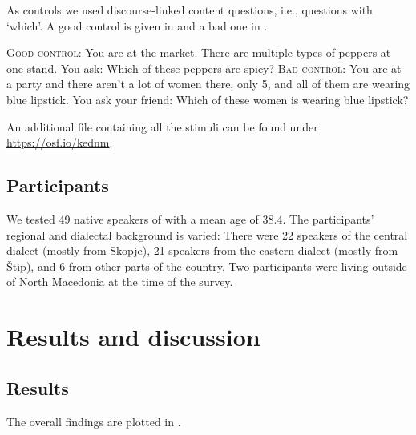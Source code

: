 \documentclass[output=paper,
colorlinks,
citecolor=brown,
newtxmath
]{langscibook}
\begin{document}
\noindent
As controls we used discourse-linked content questions, i.e., questions with `which'. A good control is given in  and a bad one in .


\eanoraggedright
\eanoraggedright \textsc{Good control:} You are at the market. There are multiple types of peppers at one stand. You ask: Which of these peppers are spicy? \label{good}
\ex \textsc{Bad control:} {You are at a party and there aren’t a lot of women there, only 5, and all of them are wearing blue lipstick. You ask your friend: Which of these women is wearing blue lipstick?} \label{bad}
\z\z

\noindent
An additional file containing all the stimuli can be found under \url{https://osf.io/kednm}.


  \subsection{Participants}\label{sec:methodp}

We tested 49 native speakers of  with a mean age of $38.4$. The participants' regional and dialectal background is varied: There were 22 speakers of the central dialect (mostly from Skopje), 21 speakers from the eastern dialect (mostly from Štip), and 6 from other parts of the country. Two participants were living outside of North Macedonia at the time of the survey.

    \largerpage[-2]

\section{Results and discussion}\label{sec:results}

\subsection{Results}
The overall findings are plotted in .


\end{document}
